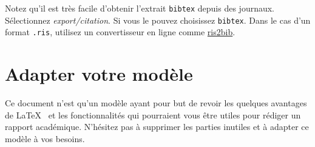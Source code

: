 Notez qu'il est très facile d'obtenir l'extrait \texttt{bibtex} depuis des journaux. Sélectionnez \emph{export/citation}. Si vous le pouvez choisissez \texttt{bibtex}. Dans le cas d'un format \texttt{.ris}, utilisez un convertisseur en ligne comme \href{http://www.bruot.org/ris2bib/}{ris2bib}.

\section{Adapter votre modèle}
Ce document n'est qu'un modèle ayant pour but de revoir les quelques avantages de \LaTeX~ et les fonctionnalités qui pourraient vous être utiles pour rédiger un rapport académique. N'hésitez pas à supprimer les parties inutiles et à adapter ce modèle à vos besoins.
